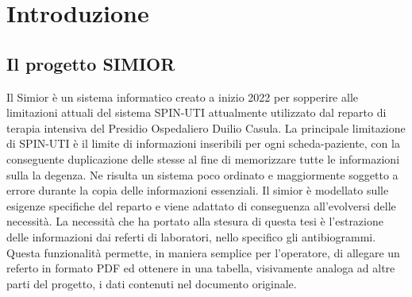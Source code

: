 \chapter{Introduzione}
\section{Il progetto SIMIOR}
Il Simior è un sistema informatico creato a inizio 2022 per sopperire alle limitazioni attuali del sistema SPIN-UTI attualmente utilizzato dal reparto di terapia intensiva del Presidio Ospedaliero Duilio Casula.
La principale limitazione di SPIN-UTI è il limite di informazioni inseribili per ogni scheda-paziente, con la conseguente duplicazione delle stesse al fine di memorizzare tutte le informazioni sulla la degenza. Ne risulta un sistema poco ordinato e maggiormente soggetto a errore durante la copia delle informazioni essenziali.
Il simior è modellato sulle esigenze specifiche del reparto e viene adattato di conseguenza all'evolversi delle necessità.
La necessità che ha portato alla stesura di questa tesi è l'estrazione delle informazioni dai referti di laboratori, nello specifico gli antibiogrammi.
Questa funzionalità permette, in maniera semplice per l'operatore, di allegare un referto in formato PDF ed ottenere in una tabella, visivamente analoga ad altre parti del progetto, i dati contenuti nel documento originale.
\par\bigskip

